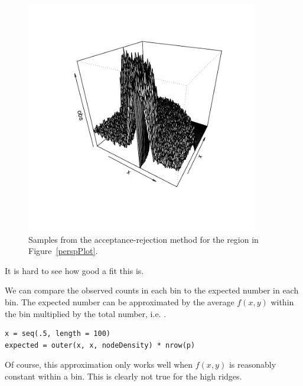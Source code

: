 \begin{figure}[htbp]
  \begin{center}
    \leavevmode
\includegraphics[width=4in]{RNG/images/nodeDensitySample.pdf}
    \caption{Samples from the acceptance-rejection method for the
      region in Figure~\ref{perspPlot}.}
    \label{fig:samplePerspPlot}
  \end{center}
\end{figure}
It is hard to see how good a fit this is.

We can compare the observed counts in each bin to the expected number
in each bin.  The expected number can be approximated by the average
$f(x, y)$ within the bin multiplied by the total number, i.e.
.
\begin{verbatim}
x = seq(.5, length = 100)
expected = outer(x, x, nodeDensity) * nrow(p)
\end{verbatim}
Of course, this approximation only works well when 
$f(x,y)$ is reasonably constant within a bin.
This is clearly not true for the high ridges.



